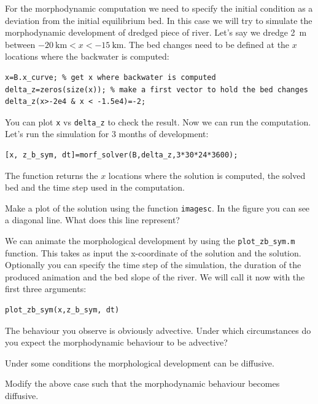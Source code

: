 \documentclass[a4paper]{article}
\begin{document}
For the morphodynamic computation we need to specify the initial condition as a deviation from the initial equilibrium bed. In this case we will try to simulate the morphodynamic development of dredged piece of river.
Let's say we dredge \SI{2}{\m} between $-\SI{20}{\kilo\m}<x<-\SI{15}{\kilo\m}$.
The bed changes need to be defined at the $x$ locations where the backwater is computed:
\begin{lstlisting}
x=B.x_curve; % get x where backwater is computed
delta_z=zeros(size(x)); % make a first vector to hold the bed changes
delta_z(x>-2e4 & x < -1.5e4)=-2;
\end{lstlisting}
You can plot \lstinline{x} vs \lstinline{delta_z} to check the result.
Now we can run the computation. Let's run the simulation for 3 months of development:
\begin{lstlisting}
[x, z_b_sym, dt]=morf_solver(B,delta_z,3*30*24*3600);
\end{lstlisting}
The function returns the $x$ locations where the solution is computed, the solved bed and the time step used in the computation.
\begin{exercise}
  Make a plot of the solution using the function \lstinline{imagesc}. In the figure you can see a diagonal line. What does this line represent?
\end{exercise}
We can animate the morphological development by using the \lstinline{plot_zb_sym.m} function. This takes as input the x-coordinate of the solution and the solution. Optionally you can specify the time step of the simulation, the duration of the produced animation and the bed slope of the river.
We will call it now with the first three arguments:
\begin{lstlisting}
plot_zb_sym(x,z_b_sym, dt) 
\end{lstlisting}
\begin{exercise}
  The behaviour you observe is obviously advective. Under which circumstances do you expect the morphodynamic behaviour to be advective?
\end{exercise}
Under some conditions the morphological development can be diffusive.
\begin{exercise}
  Modify the above case such that the morphodynamic behaviour becomes diffusive.
\end{exercise}

\printsolutions
\end{document}
